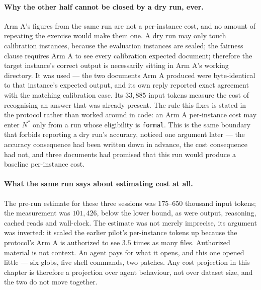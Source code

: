 \paragraph{Why the other half cannot be closed by a dry run, ever.}
Arm A's figures from the same run are not a per-instance cost, and no amount of repeating the
exercise would make them one. A dry run may only touch calibration instances, because the
evaluation instances are sealed; the fairness clause requires Arm A to see every calibration
expected document; therefore the target instance's correct output is necessarily sitting in
Arm A's working directory. It was used --- the two documents Arm A produced were
byte-identical to that instance's expected output, and its own reply reported exact agreement
with the matching calibration case. Its $33{,}885$ input tokens measure the cost of
recognising an answer that was already present. The rule this fixes is stated in the protocol
rather than worked around in code: an Arm A per-instance cost may enter $N^{*}$ only from a
run whose eligibility is \texttt{formal}. This is the same boundary that forbids reporting a
dry run's accuracy, noticed one argument later --- the accuracy consequence had been written
down in advance, the cost consequence had not, and three documents had promised that this run
would produce a baseline per-instance cost.

\paragraph{What the same run says about estimating cost at all.}
The pre-run estimate for these three sessions was $175$--$650$ thousand input tokens; the
measurement was $101{,}426$, below the lower bound, as were output, reasoning, cached reads
and wall-clock. The estimate was not merely imprecise, its argument was inverted: it scaled
the earlier pilot's per-instance tokens up because the protocol's Arm A is authorized to see
$3.5$ times as many files. Authorized material is not context. An agent pays for what it
opens, and this one opened little --- six globs, five shell commands, two patches. Any cost
projection in this chapter is therefore a projection over agent behaviour, not over dataset
size, and the two do not move together.

